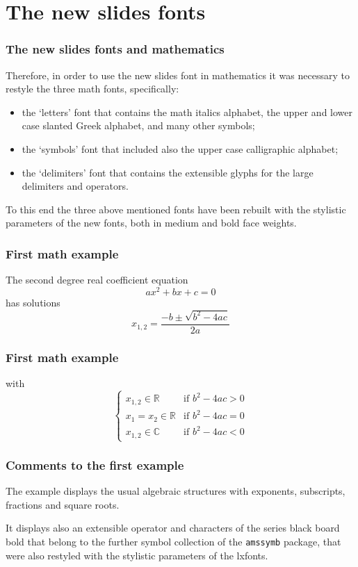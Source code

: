 \documentclass{beamer}
\begin{document}
\section{The new slides fonts}

\begin{frame}\frametitle{The new slides fonts and mathematics}\small
Therefore, in order to use the new slides font in mathematics it was necessary to restyle the three math fonts, specifically: 
\begin{itemize}
\item the `letters' font that contains the math italics alphabet, the upper and lower case slanted Greek alphabet, and many other symbols;
\item the `symbols' font that included also the upper case calligraphic alphabet;
\item the `delimiters' font that contains the extensible glyphs for the large delimiters and operators.
\end{itemize}

To this end the three above mentioned fonts have been rebuilt with the stylistic parameters of the new fonts, both in medium and bold face weights.
\end{frame}

\begin{frame}\frametitle{First math example}
The second degree real coefficient equation
\begin{equation}
ax^2 + bx + c = 0
\end{equation}
has solutions
\begin{equation}
x_{1,2} = \frac{-b \pm\sqrt{b^2-4ac}}{2a}
\end{equation}
\end{frame}


\begin{frame}\frametitle{First math example}
\noindent with
\begin{equation}
\begin{cases}
x_{1,2} \in \mathbb{R} &\text{if } b^2-4ac>0\\
x_1=x_2 \in \mathbb{R} &\text{if } b^2-4ac=0\\
x_{1,2} \in \mathbb{C} &\text{if } b^2-4ac<0
\end{cases}
\end{equation}
\end{frame}

\begin{frame}\frametitle{Comments to the first example}
The example displays the usual algebraic structures with exponents, subscripts, fractions and square roots.

It displays also an extensible operator and characters of the series \alert{black board bold} that belong to the further symbol collection of the \texttt{amssymb} package, that were also restyled with the stylistic parameters of the lxfonts.

\end{frame}
\end{document}
